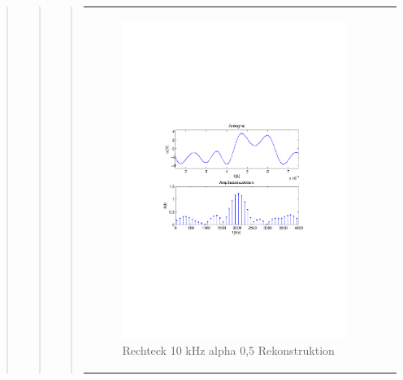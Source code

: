 \begin{quote}
\begin{quote}
\begin{quote}
\begin{center}
\begin{tabular}{ll}
            \hspace{-5cm}
                \begin{minipage}{0.6\textwidth}
                    \begin{figure}[H]
                        \includegraphics[scale=0.7, trim = 35mm 100mm 35mm 95mm, clip]{Bilder/flatrec10_05}
                          \caption{Rechteck 10 kHz alpha 0,5 Rekonstruktion}
		                  \label{fig:flatrec10_05}
                    \end{figure}
                \end{minipage}
                

\end{tabular}
\end{center}
\end{quote}
\end{quote}
\end{quote}
